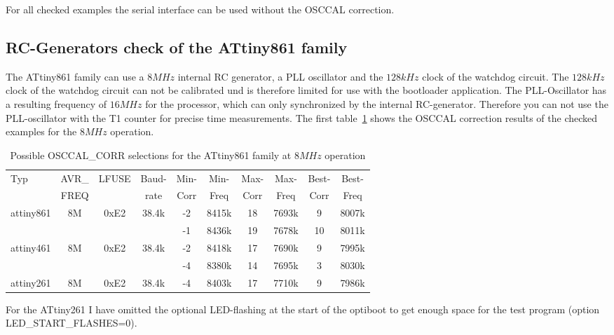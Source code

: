 For all checked examples the serial interface can be used without the
OSCCAL correction.


\subsection{RC-Generators check of the ATtiny861 family}

The ATtiny861 family can use a \(8MHz\) internal RC generator, a PLL oscillator
and the \(128kHz\) clock of the watchdog circuit.
The \(128kHz\) clock of the watchdog circuit can not be calibrated und is
therefore limited for use with the bootloader application.
The PLL-Oscillator has a resulting frequency of \(16MHz\) for the processor,
which can only synchronized by the internal RC-generator.
Therefore you can not use the PLL-oscillator with the T1 counter
for precise time measurements.
The first table~\ref{tab:tiny861freq8} shows the OSCCAL correction results of the checked examples
for the \(8MHz\) operation.

\begin{table}[H]
  \begin{center}
    \begin{tabular}{| l | c | c | c || c | c || c | c || c | c |}
    \hline
   Typ  &       AVR\_ & LFUSE & Baud- & Min- & Min- & Max- & Max- & Best- & Best-  \\
        &       FREQ  &       & rate & Corr & Freq & Corr & Freq  & Corr  & Freq  \\
    \hline
    \hline
attiny861 &          8M & 0xE2  & 38.4k &  -2  & 8415k & 18  & 7693k  & 9  & 8007k \\
          &             &       &       &  -1  & 8436k & 19  & 7678k  & 10 & 8011k \\
    \hline
attiny461  &         8M & 0xE2  & 38.4k &  -2  & 8418k & 17 & 7690k  & 9  & 7995k \\
           &            &       &       &  -4  & 8380k & 14 & 7695k  & 3  & 8030k \\
    \hline
attiny261  &         8M & 0xE2  & 38.4k &  -4  & 8403k & 17 & 7710k  & 9  & 7986k \\
    \hline
    \end{tabular}
  \end{center}
  \caption{Possible OSCCAL\_CORR selections for the ATtiny861 family at \(8MHz\) operation}
  \label{tab:tiny861freq8}
\end{table}

For the ATtiny261 I have omitted the optional LED-flashing at the start of the optiboot
to get enough space for the test program (option LED\_START\_FLASHES=0).



